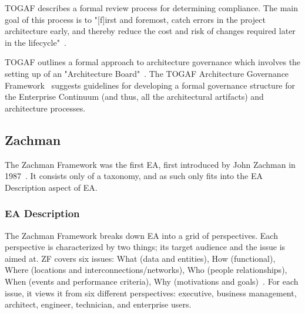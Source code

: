 TOGAF describes a formal review process for determining compliance. The main goal of this process is to "[f]irst and foremost, catch errors in the project architecture early, and thereby reduce the cost and risk of changes required later in the lifecycle"~\cite[Ch. 48.3.1]{togaf9.1}.



TOGAF outlines a formal approach to architecture governance which involves the setting up of an "Architecture Board"~\cite[Ch. 47]{togaf9.1}. The TOGAF Architecture Governance Framework~\cite[Ch. 50]{togaf9.1} suggests guidelines for developing a formal governance structure for the Enterprise Continuum (and thus, all the architectural artifacts) and architecture processes. 



%

\subsection{Zachman}
The Zachman Framework was the first EA, first introduced by John Zachman in 1987~\cite{sessions2007,zachman}. It consists only of a taxonomy, and as such only fits into the EA Description aspect of EA. 

\subsubsection{EA Description}

The Zachman Framework breaks down EA into a grid of perspectives. Each perspective is characterized by two things; its target audience and the issue is aimed at. ZF covers six issues: What (data and entities), How (functional), Where (locations and interconnections/networks), Who (people relationships), When (events and performance criteria), Why (motivations and goals)~\cite{jungle2004}. For each issue, it views it from six different perspectives: executive, business management, architect, engineer, technician, and enterprise users. 

